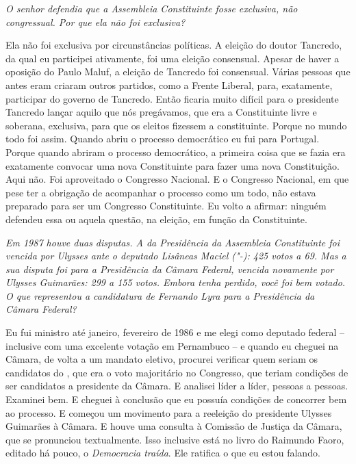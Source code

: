 \medskip

\noindent\emph{O senhor defendia que a Assembleia Constituinte fosse exclusiva,
não congressual. Por que ela não foi exclusiva?}

Ela não foi exclusiva por circunstâncias políticas. A
eleição do doutor Tancredo, da qual eu participei ativamente, foi uma
eleição consensual. Apesar de haver a oposição do Paulo Maluf, a eleição
de Tancredo foi consensual. Várias pessoas que antes eram  criaram
outros partidos, como a Frente Liberal, para, exatamente, participar do
governo de Tancredo. Então ficaria muito difícil para o presidente
Tancredo lançar aquilo que nós pregávamos, que era a Constituinte livre
e soberana, exclusiva, para que os eleitos fizessem a constituinte.
Porque no mundo todo foi assim. Quando abriu o processo democrático eu
fui para Portugal. Porque quando abriram o processo democrático, a
primeira coisa que se fazia era exatamente convocar uma nova
Constituinte para fazer uma nova Constituição. Aqui não. Foi aproveitado
o Congresso Nacional. E o Congresso Nacional, em que pese ter a
obrigação de acompanhar o processo como um todo, não estava preparado
para ser um Congresso Constituinte. Eu volto a afirmar: ninguém defendeu
essa ou aquela questão, na eleição, em função da Constituinte.

\medskip

\noindent\emph{Em 1987 houve duas disputas. A da Presidência da Assembleia
Constituinte foi vencida por Ulysses ante o deputado Lisâneas Maciel
("-): 425 votos a 69. Mas a sua disputa foi para a Presidência da
Câmara Federal, vencida novamente por Ulysses Guimarães: 299 a 155
votos. Embora tenha perdido, você foi bem votado. O que representou a
candidatura de Fernando Lyra para a Presidência da Câmara Federal?}

Eu fui ministro até janeiro, fevereiro de 1986 e me elegi
como deputado federal -- inclusive com uma excelente votação em
Pernambuco -- e quando eu cheguei na Câmara, de volta a um mandato
eletivo, procurei verificar quem seriam os candidatos do , que era o
voto majoritário no Congresso, que teriam condições de ser candidatos a
presidente da Câmara. E analisei líder a líder, pessoas a pessoas.
Examinei bem. E cheguei à conclusão que eu possuía condições de
concorrer bem ao processo. E começou um movimento para a reeleição do
presidente Ulysses Guimarães à Câmara. E houve uma consulta à Comissão
de Justiça da Câmara, que se pronunciou textualmente. Isso inclusive
está no livro do Raimundo Faoro, editado há pouco, o \emph{Democracia
traída}. Ele ratifica o que eu estou falando.

